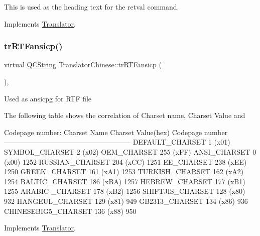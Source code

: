 This is used as the heading text for the retval command. 

Implements \mbox{\hyperlink{class_translator}{Translator}}.

\mbox{\label{class_translator_chinese_a4f6b051cede382e7d4234506aeaccedb}} 
\subsubsection{\texorpdfstring{trRTFansicp()}{trRTFansicp()}}
{\footnotesize\ttfamily virtual \mbox{\hyperlink{class_q_c_string}{Q\+C\+String}} Translator\+Chinese\+::tr\+R\+T\+Fansicp (\begin{DoxyParamCaption}{ }\end{DoxyParamCaption})\hspace{0.3cm}{\ttfamily [inline]}, {\ttfamily [virtual]}}

Used as ansicpg for R\+TF file

The following table shows the correlation of Charset name, Charset Value and 
\begin{DoxyPre}
Codepage number:
Charset Name       Charset Value(hex)  Codepage number
------------------------------------------------------
DEFAULT\_CHARSET           1 (x01)
SYMBOL\_CHARSET            2 (x02)
OEM\_CHARSET             255 (xFF)
ANSI\_CHARSET              0 (x00)            1252
RUSSIAN\_CHARSET         204 (xCC)            1251
EE\_CHARSET              238 (xEE)            1250
GREEK\_CHARSET           161 (xA1)            1253
TURKISH\_CHARSET         162 (xA2)            1254
BALTIC\_CHARSET          186 (xBA)            1257
HEBREW\_CHARSET          177 (xB1)            1255
ARABIC \_CHARSET         178 (xB2)            1256
SHIFTJIS\_CHARSET        128 (x80)             932
HANGEUL\_CHARSET         129 (x81)             949
GB2313\_CHARSET          134 (x86)             936
CHINESEBIG5\_CHARSET     136 (x88)             950
\end{DoxyPre}
 

Implements \mbox{\hyperlink{class_translator_a9953a4c0e6a4fc7d017abcd5c2939e0f}{Translator}}.

\mbox{\label{class_translator_chinese_a0935a089ac2dc882cf25fe6cf1185fee}} 
